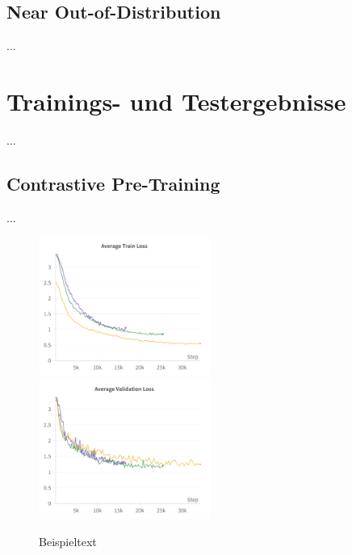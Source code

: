 \subsection{Near Out-of-Distribution} \label{sec:da-fusion-ood-results}

...

\section{Trainings- und Testergebnisse} \label{sec:supcon-results}

...

\subsection{Contrastive Pre-Training} \label{sec:supcon-pre-results}

...

\begin{figure}
	\centering
	\includegraphics[width=0.5\textwidth]{figure_results_supcon-pre_avg-train-loss.png}%
	\includegraphics[width=0.5\textwidth]{figure_results_supcon-pre_avg-val-loss.png}
	\caption{Beispieltext}
	\label{fig:supcon-pre-loss}
\end{figure}

